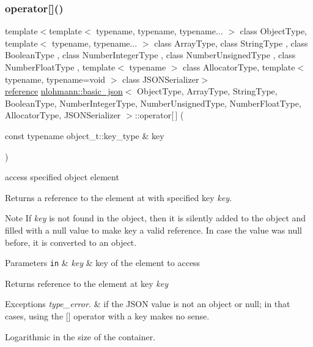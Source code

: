 \subsubsection{\texorpdfstring{operator[]()}{operator[]()}\hspace{0.1cm}{\footnotesize\ttfamily [3/8]}}
{\footnotesize\ttfamily template$<$template$<$ typename, typename, typename... $>$ class Object\+Type, template$<$ typename, typename... $>$ class Array\+Type, class String\+Type , class Boolean\+Type , class Number\+Integer\+Type , class Number\+Unsigned\+Type , class Number\+Float\+Type , template$<$ typename $>$ class Allocator\+Type, template$<$ typename, typename=void $>$ class J\+S\+O\+N\+Serializer$>$ \\
\hyperlink{classnlohmann_1_1basic__json_ac6a5eddd156c776ac75ff54cfe54a5bc}{reference} \hyperlink{classnlohmann_1_1basic__json}{nlohmann\+::basic\+\_\+json}$<$ Object\+Type, Array\+Type, String\+Type, Boolean\+Type, Number\+Integer\+Type, Number\+Unsigned\+Type, Number\+Float\+Type, Allocator\+Type, J\+S\+O\+N\+Serializer $>$\+::operator\mbox{[}$\,$\mbox{]} (\begin{DoxyParamCaption}\item[{const typename object\+\_\+t\+::key\+\_\+type \&}]{key }\end{DoxyParamCaption})\hspace{0.3cm}{\ttfamily [inline]}}



access specified object element 

Returns a reference to the element at with specified key {\itshape key}.

\begin{DoxyNote}{Note}
If {\itshape key} is not found in the object, then it is silently added to the object and filled with a {\ttfamily null} value to make {\ttfamily key} a valid reference. In case the value was {\ttfamily null} before, it is converted to an object.
\end{DoxyNote}

\begin{DoxyParams}[1]{Parameters}
\mbox{\tt in}  & {\em key} & key of the element to access\\
\hline
\end{DoxyParams}
\begin{DoxyReturn}{Returns}
reference to the element at key {\itshape key} 
\end{DoxyReturn}

\begin{DoxyExceptions}{Exceptions}
{\em type\+\_\+error.} & if the J\+S\+ON value is not an object or null; in that cases, using the \mbox{[}\mbox{]} operator with a key makes no sense.\\
\hline
\end{DoxyExceptions}
Logarithmic in the size of the container.

